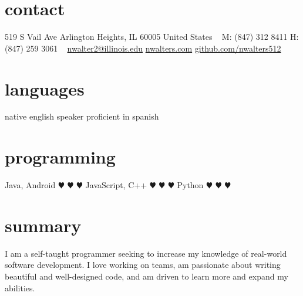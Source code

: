 \documentclass[]{friggeri-cv} %
\begin{document}


\begin{aside} %
\section{contact}
519 S Vail Ave
Arlington Heights, IL 60005
United States
~
M: (847) 312 8411
H: (847) 259 3061
~
\href{mailto:nwalter2@illinois.edu}{nwalter2@illinois.edu}
\href{http://www.nwalters.com}{nwalters.com}
\href{http://github.com/nwalters512}{github.com/nwalters512}
\section{languages}
native english speaker
proficient in spanish
\section{programming}
Java, Android {\color{red} $\varheartsuit$} {\color{red} $\varheartsuit$} {\color{red} $\varheartsuit$}  
JavaScript, C++ {\color{red} $\varheartsuit$} {\color{red} $\varheartsuit$} {\color{white} $\varheartsuit$} 
Python {\color{red} $\varheartsuit$} {\color{white} $\varheartsuit$} {\color{white} $\varheartsuit$} 
\end{aside}


\section{summary}

I am a self-taught programmer seeking to increase my knowledge of real-world software development. I love working on teams, am passionate about writing beautiful and well-designed code, and am driven to learn more and expand my abilities.

\end{document}
